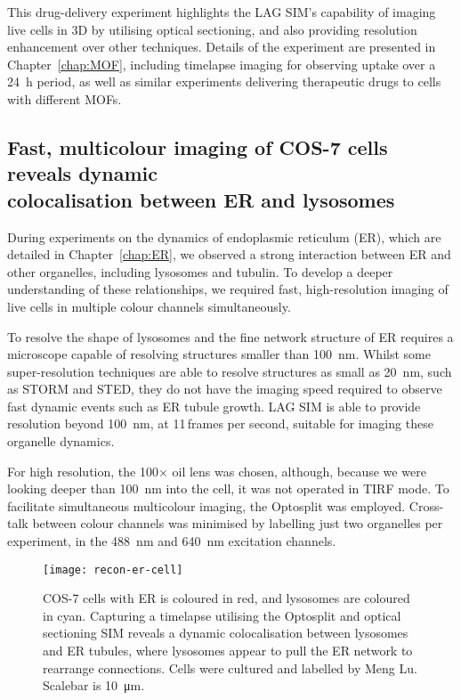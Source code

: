 This drug-delivery experiment highlights the LAG SIM's capability of imaging live cells in 3D by utilising optical sectioning, and also providing resolution enhancement over other techniques.
Details of the experiment are presented in Chapter~\ref{chap:MOF}, including timelapse imaging for observing uptake over a \SI{24}{\hour} period, as well as similar experiments delivering therapeutic drugs to cells with different MOFs.

\subsection[Fast, multicolour imaging of COS-7 cells reveals dynamic colocalisation between ER and lysosomes]{Fast, multicolour imaging of COS-7 cells reveals dynamic\\ colocalisation between ER and lysosomes}
During experiments on the dynamics of endoplasmic reticulum (ER), which are detailed in Chapter~\ref{chap:ER}, we observed a strong interaction between ER and other organelles, including lysosomes and tubulin.
To develop a deeper understanding of these relationships, we required fast, high-resolution imaging of live cells in multiple colour channels simultaneously.

To resolve the shape of lysosomes and the fine network structure of ER requires a microscope capable of resolving structures smaller than \SI{100}{\nano\metre}.
Whilst some super-resolution techniques are able to resolve structures as small as \SI{20}{\nano\metre}, such as STORM and STED, they do not have the imaging speed required to observe fast dynamic events such as ER tubule growth.
LAG SIM is able to provide resolution beyond \SI{100}{\nano\metre}, at 11\,frames per second, suitable for imaging these organelle dynamics.

For high resolution, the 100$\times$ oil lens was chosen, although, because we were looking deeper than \SI{100}{\nano\metre} into the cell, it was not operated in TIRF mode.
To facilitate simultaneous multicolour imaging, the Optosplit was employed.
Cross-talk between colour channels was minimised by labelling just two organelles per experiment, in the \SI{488}{\nano\metre} and \SI{640}{\nano\metre} excitation channels.

\begin{figure}[tbp!]
\centering
\texttt{[image: recon-er-cell]}
\caption[LAG SIM: Fast, multicolour imaging of ER in cells reveals co-localisation between lysosomes and ER tubules]{COS-7 cells with ER is coloured in red, and lysosomes are coloured in cyan. Capturing a timelapse utilising the Optosplit and optical sectioning SIM reveals a dynamic colocalisation between lysosomes and ER tubules, where lysosomes appear to pull the ER network to rearrange connections. Cells were cultured and labelled by Meng Lu. Scalebar is \SI{10}{\micro\metre}. }
\label{fig:recon-er-cell}
\end{figure}
\afterpage{\clearpage}

